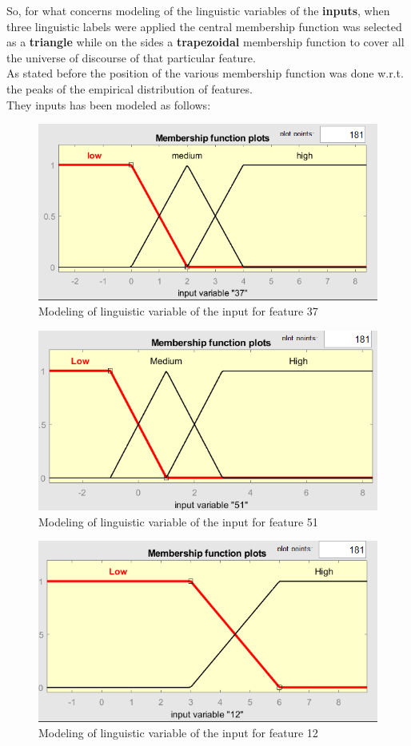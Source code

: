 So, for what concerns modeling of the linguistic variables of the \textbf{inputs}, when three linguistic labels were applied the central membership function was selected as a \textbf{triangle} while on the sides a \textbf{trapezoidal} membership function to cover all the universe of discourse of that particular feature.\\ As stated before the position of the various membership function was done w.r.t. the peaks of the empirical distribution of features. \\

They inputs has been modeled as follows:
\begin{figure}[H]
	\centering
	\includegraphics[width=0.5\linewidth]{img/lin_var_37.png}
	\caption{Modeling of linguistic variable of the input for feature 37}
\end{figure}
\begin{figure}[H]
	\centering
	\includegraphics[width=0.5\linewidth]{img/lin_var_51.png}
	\caption{Modeling of linguistic variable of the input for feature 51}
\end{figure}
\begin{figure}[H]
	\centering
	\includegraphics[width=0.5\linewidth]{img/lin_var_12.png}
	\caption{Modeling of linguistic variable of the input for feature 12}
\end{figure}

